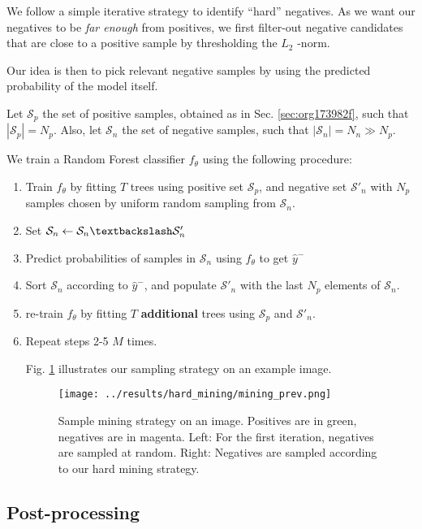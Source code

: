 \documentclass[11pt]{article}
\begin{document}
We follow a simple iterative strategy to identify ``hard'' negatives.
As we want our negatives to be \emph{far enough} from positives, we first filter-out negative candidates that are
close to a positive sample by thresholding the \(L_2\) -norm.

Our idea is then to pick relevant negative samples by using the predicted probability of the model itself.

Let \(\mathcal{S}_p\) the set of positive samples, obtained as in Sec. \ref{sec:org173982f}, such that \(|\mathcal{S}_p|=N_p\).
Also, let \(\mathcal{S}_n\) the set of negative samples, such that \(|\mathcal{S}_n|=N_n \gg N_p\).


We train a Random Forest classifier \(f_\theta\) using the following procedure:

\begin{enumerate}
\item Train \(f_\theta\) by fitting \(T\) trees using positive set \(\mathcal{S}_p\), and negative set \(\mathcal{S}'_n\) with \(N_p\)
samples chosen by uniform random sampling from \(\mathcal{S}_n\).
\item Set \(\mathcal{S}_n \leftarrow \mathcal{S}_n \textbackslash \mathcal{S}'_n\)
\item Predict probabilities of samples in \(\mathcal{S}_n\) using \(f_\theta\) to get \(\hat{y}^-\)
\item Sort \(\mathcal{S}_n\) according to \(\hat{y}^-\), and populate
\(\mathcal{S}'_n\) with the last \(N_p\) elements of \(\mathcal{S}_n\).
\item re-train \(f_\theta\) by fitting \(T\) \textbf{additional} trees using \(\mathcal{S}_p\) and \(\mathcal{S}'_n\).
\item Repeat steps 2-5 \(M\) times.

Fig. \ref{fig:org6cb1d60} illustrates our sampling strategy on an example image.

\begin{figure}[htbp]
\centering
\texttt{[image: ../results/hard\_mining/mining\_prev.png]}
\caption{\label{fig:org6cb1d60}Sample mining strategy on an image. Positives are in green, negatives are in magenta. Left: For the first iteration, negatives are sampled at random. Right: Negatives are sampled according to our hard mining strategy.}
\end{figure}
\end{enumerate}

\subsection{Post-processing}
\label{sec:org710cb33}
\end{document}
